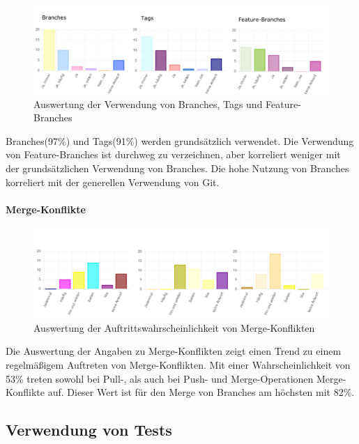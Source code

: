 \begin{figure}[htbp]
  \includegraphics[width=\textwidth, height=\textheight, keepaspectratio]
    {resources/survey-vcs-branches.pdf}
  \caption{Auswertung der Verwendung von Branches, Tags und Feature-Branches}
\end{figure}

Branches(97\%) und Tags(91\%) werden grundsätzlich verwendet. Die Verwendung von Feature-Branches ist durchweg zu verzeichnen, aber korreliert weniger mit der grundsätzlichen Verwendung von Branches. Die hohe Nutzung von Branches korreliert mit der generellen Verwendung von Git.

\paragraph{Merge-Konflikte}

\begin{figure}[htbp]
  \includegraphics[width=\textwidth, height=\textheight, keepaspectratio]
    {resources/survey-vcs-merge.pdf}
  \caption{Auswertung der Auftrittswahrscheinlichkeit von Merge-Konflikten}
\end{figure}

Die Auswertung der Angaben zu Merge-Konflikten zeigt einen Trend zu einem regelmäßigem Auftreten von Merge-Konflikten. Mit einer Wahrscheinlichkeit von 53\% treten sowohl bei Pull-, als auch bei Push- und Merge-Operationen Merge-Konflikte auf. Dieser Wert ist für den Merge von Branches am höchsten mit 82\%. 

\subsection{Verwendung von Tests}


